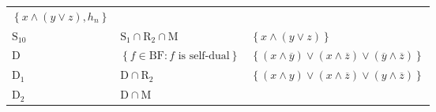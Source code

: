 \documentclass[10pt,a4paper]{article}
\newcommand{\ovl}{\overline}
\newcommand{\set}[1]{\left\{#1\right\}}
\newcommand{\clonefont}[1]{\mathrm{#1}}
\begin{document}
\begin{figure}[hbtp]
\begin{small}
\begin{longtable}[]{p{}p{}p{}}
\begin{minipage}[t]{0.38\columnwidth}
                \(\set{x \land (y \lor z), h_n}\)\strut
            \end{minipage}\tabularnewline
            \begin{minipage}[t]{0.12\columnwidth}\raggedright
                \(\clonefont{S_{10}}\)\strut
            \end{minipage} & \begin{minipage}[t]{0.41\columnwidth}\raggedright
                \(\clonefont{S_1} \cap \clonefont{R_2} \cap \clonefont{M}\)\strut
            \end{minipage} & \begin{minipage}[t]{0.38\columnwidth}\raggedright
                \(\set{x \land (y \lor z)}\)\strut
            \end{minipage}\tabularnewline
            \begin{minipage}[t]{0.12\columnwidth}\raggedright
                \(\clonefont{D}\)\strut
            \end{minipage} & \begin{minipage}[t]{0.41\columnwidth}\raggedright
                \(\set{f \in \clonefont{BF} : f \text{ is self-dual}}\)\strut
            \end{minipage} & \begin{minipage}[t]{0.38\columnwidth}\raggedright
                \(\set{(x \land \ovl{y}) \lor (x \land \ovl{z}) \lor (\ovl{y} \land \ovl{z})}\)\strut
            \end{minipage}\tabularnewline
            \begin{minipage}[t]{0.12\columnwidth}\raggedright
                \(\clonefont{D_1}\)\strut
            \end{minipage} & \begin{minipage}[t]{0.41\columnwidth}\raggedright
                \(\clonefont{D} \cap \clonefont{R_2}\)\strut
            \end{minipage} & \begin{minipage}[t]{0.38\columnwidth}\raggedright
                \(\set{(x \land y) \lor (x \land \ovl{z}) \lor ({y} \land \ovl{z})}\)\strut
            \end{minipage}\tabularnewline
            \begin{minipage}[t]{0.12\columnwidth}\raggedright
                \(\clonefont{D_2}\)\strut
            \end{minipage} & \begin{minipage}[t]{0.41\columnwidth}\raggedright
                \(\clonefont{D} \cap \clonefont{M}\)\strut
            \end{minipage} & \begin{minipage}[t]{0.38\columnwidth}\raggedright

\end{minipage}
\end{longtable}
\end{small}
\end{figure}
\end{document}
